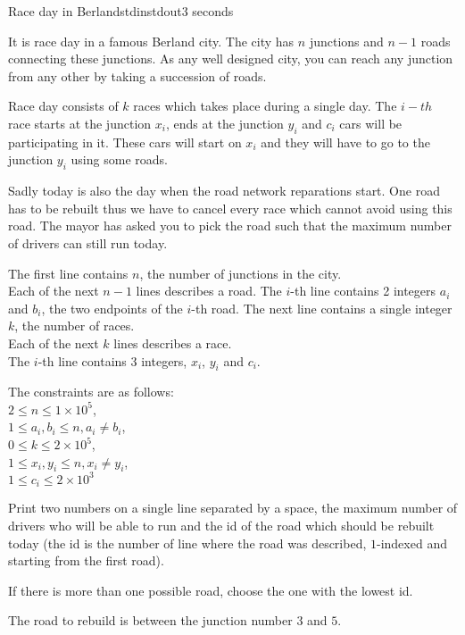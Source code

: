 \begin{problem}{Race day in Berland}{stdin}{stdout}{3 seconds}



It is race day in a famous Berland city. 
The city has $n$ junctions and $n-1$ roads connecting these junctions. 
As any well designed city, you can reach any junction from any other by taking a succession of roads. 

Race day consists of $k$ races which takes place during a single day. The $i-th$ race starts at the junction $x_i$, ends at the junction $y_i$ and $c_i$ cars will be participating in it. These cars will start on $x_i$ and they will have to go to the junction $y_i$ using some roads. 


Sadly today is also the day when the road network reparations start. One road has to be rebuilt thus we have to cancel every race which cannot avoid using this road. 
The mayor has asked you to pick the road such that the maximum number of drivers can still run today.

\InputFile

The first line contains $n$, the number of junctions in the city.\\ 
Each of the next $n-1$ lines describes a road.
The $i$-th line contains 2 integers $a_i$ and $b_i$, the two endpoints of the $i$-th road.
The next line contains a single integer $k$, the number of races.\\ 
Each of the next $k$ lines describes a race.\\ 
The $i$-th line contains 3 integers, $x_i$, $y_i$ and $c_i$.

The constraints are as follows:\\ 
$2\le n \le 1\times 10^5$,\\ 
$1\le a_i,b_i\le n, a_i\not = b_i$,\\ 
$0\le k \le 2\times 10^5$,\\ 
$1\le x_i,y_i\le n, x_i\not = y_i$,\\ 
$1\le c_i \le 2\times 10^3$ 


\OutputFile
Print two numbers on a single line separated by a space, the maximum number of drivers who will be able to run and the id of the road which should be rebuilt today (the id is the number of line where the road was described, $1$-indexed and starting from the first road).

If there is more than one possible road, choose the one with the lowest id.

\Example

\begin{examplewide}
%
\end{examplewide}

The road to rebuild is between the junction number $3$ and $5$.

\end{problem}

